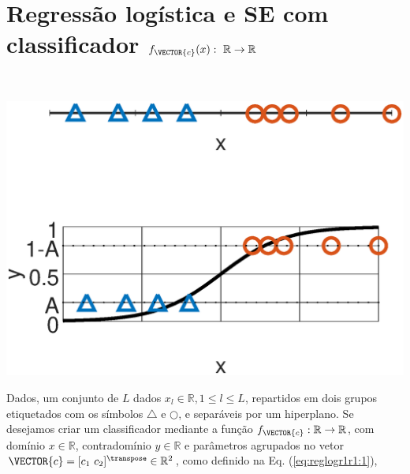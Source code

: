 \newpage

\section{Regressão logística e SE com classificador $f_{\VECTOR{c}}(x):~\mathbb{R} \rightarrow \mathbb{R}$}




\begin{theorem}\label{theo:reglogr1r1:1}
~\\
\noindent
\begin{minipage}{0.45\textwidth}
\centering
\includegraphics[width=0.95\linewidth]{chapters/classificacao/mfiles/reglogr1r1/reglogr1r1.eps} 
\end{minipage}
\begin{minipage}{0.55\textwidth}
Dados, um conjunto de $L$ dados $x_l \in \mathbb{R}, 1 \leq l \leq L$,
repartidos em dois grupos etiquetados com os símbolos $\bigtriangleup$ e $\bigcirc$, 
e separáveis por um hiperplano.
Se desejamos criar um classificador mediante 
a função  $f_{\VECTOR{c}}:\mathbb{R} \rightarrow \mathbb{R}$,
com domínio $x \in \mathbb{R}$, contradomínio $y \in \mathbb{R}$ e 
parâmetros agrupados no vetor $\VECTOR{c}=[c_1~ c_2]^{\transpose}\in \mathbb{R}^{2}$,
como definido na Eq. (\ref{eq:reglogr1r1:1}),
\begin{equation}\label{eq:reglogr1r1:1}

\end{equation}
\end{minipage}
\end{theorem}
